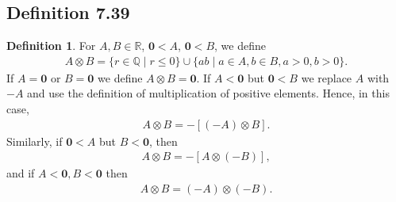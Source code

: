 \documentclass[openany, amssymb, psamsfonts]{amsart}
\newcommand{\bbQ}{\mathbb{Q}}
\newcommand{\bbR}{\mathbb{R}}
\theoremstyle{definition}
\newtheorem{defn}{Definition}[section]
\numberwithin{equation}{section}
\begin{document}
\subsection*{Definition 7.39}
\begin{defn}
\label{7.39}
	For $A,B\in\bbR$, $\mathbf{0}<A$, $\mathbf{0}<B$, we define
	\begin{align*}
		A \otimes B = \{r \in \bbQ \mid r \leq 0\} \cup \{ab \mid a\in A, b\in B, a > 0, b > 0\}.
	\end{align*}
	If $A = \mathbf{0}$ or $B = \mathbf{0}$ we define $A \otimes B = \mathbf{0}$.
	If $A<\mathbf{0}$ but $\mathbf{0}<B$ we replace $A$ with $-A$ and use the definition of multiplication of positive elements. Hence, in this case,
	\begin{align*}
		A\otimes B=-[(-A)\otimes B].
	\end{align*}
	Similarly, if $\mathbf{0}<A$ but $B<\mathbf{0}$, then 
	\begin{align*}
		A\otimes B=-[A\otimes (-B)],
	\end{align*}
	and 
	if $A<\mathbf{0}, B<\mathbf{0}$ then
	\begin{align*}
		A \otimes B= (-A) \otimes (-B).
	\end{align*}
\end{defn}
\end{document}
